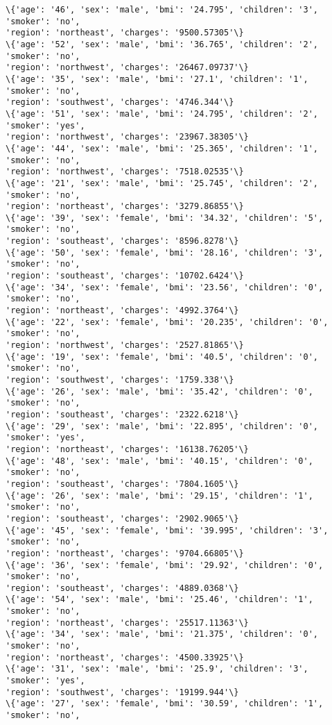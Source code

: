 \documentclass[11pt]{article}
\begin{document}
\begin{Verbatim}[commandchars=\\\{\}]
\{'age': '46', 'sex': 'male', 'bmi': '24.795', 'children': '3', 'smoker': 'no',
'region': 'northeast', 'charges': '9500.57305'\}
\{'age': '52', 'sex': 'male', 'bmi': '36.765', 'children': '2', 'smoker': 'no',
'region': 'northwest', 'charges': '26467.09737'\}
\{'age': '35', 'sex': 'male', 'bmi': '27.1', 'children': '1', 'smoker': 'no',
'region': 'southwest', 'charges': '4746.344'\}
\{'age': '51', 'sex': 'male', 'bmi': '24.795', 'children': '2', 'smoker': 'yes',
'region': 'northwest', 'charges': '23967.38305'\}
\{'age': '44', 'sex': 'male', 'bmi': '25.365', 'children': '1', 'smoker': 'no',
'region': 'northwest', 'charges': '7518.02535'\}
\{'age': '21', 'sex': 'male', 'bmi': '25.745', 'children': '2', 'smoker': 'no',
'region': 'northeast', 'charges': '3279.86855'\}
\{'age': '39', 'sex': 'female', 'bmi': '34.32', 'children': '5', 'smoker': 'no',
'region': 'southeast', 'charges': '8596.8278'\}
\{'age': '50', 'sex': 'female', 'bmi': '28.16', 'children': '3', 'smoker': 'no',
'region': 'southeast', 'charges': '10702.6424'\}
\{'age': '34', 'sex': 'female', 'bmi': '23.56', 'children': '0', 'smoker': 'no',
'region': 'northeast', 'charges': '4992.3764'\}
\{'age': '22', 'sex': 'female', 'bmi': '20.235', 'children': '0', 'smoker': 'no',
'region': 'northwest', 'charges': '2527.81865'\}
\{'age': '19', 'sex': 'female', 'bmi': '40.5', 'children': '0', 'smoker': 'no',
'region': 'southwest', 'charges': '1759.338'\}
\{'age': '26', 'sex': 'male', 'bmi': '35.42', 'children': '0', 'smoker': 'no',
'region': 'southeast', 'charges': '2322.6218'\}
\{'age': '29', 'sex': 'male', 'bmi': '22.895', 'children': '0', 'smoker': 'yes',
'region': 'northeast', 'charges': '16138.76205'\}
\{'age': '48', 'sex': 'male', 'bmi': '40.15', 'children': '0', 'smoker': 'no',
'region': 'southeast', 'charges': '7804.1605'\}
\{'age': '26', 'sex': 'male', 'bmi': '29.15', 'children': '1', 'smoker': 'no',
'region': 'southeast', 'charges': '2902.9065'\}
\{'age': '45', 'sex': 'female', 'bmi': '39.995', 'children': '3', 'smoker': 'no',
'region': 'northeast', 'charges': '9704.66805'\}
\{'age': '36', 'sex': 'female', 'bmi': '29.92', 'children': '0', 'smoker': 'no',
'region': 'southeast', 'charges': '4889.0368'\}
\{'age': '54', 'sex': 'male', 'bmi': '25.46', 'children': '1', 'smoker': 'no',
'region': 'northeast', 'charges': '25517.11363'\}
\{'age': '34', 'sex': 'male', 'bmi': '21.375', 'children': '0', 'smoker': 'no',
'region': 'northeast', 'charges': '4500.33925'\}
\{'age': '31', 'sex': 'male', 'bmi': '25.9', 'children': '3', 'smoker': 'yes',
'region': 'southwest', 'charges': '19199.944'\}
\{'age': '27', 'sex': 'female', 'bmi': '30.59', 'children': '1', 'smoker': 'no',

\end{Verbatim}
\end{document}
